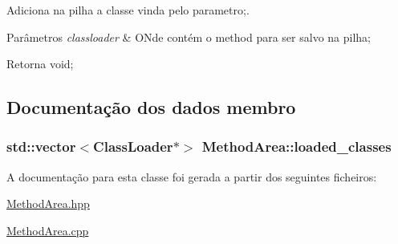 Adiciona na pilha a classe vinda pelo parametro;. 


\begin{DoxyParams}{Parâmetros}
{\em classloader} & O\+Nde contém o method para ser salvo na pilha; \\
\hline
\end{DoxyParams}
\begin{DoxyReturn}{Retorna}
void; 
\end{DoxyReturn}


\subsection{Documentação dos dados membro}
\subsubsection[{\texorpdfstring{loaded\+\_\+classes}{loaded_classes}}]{\setlength{\rightskip}{0pt plus 5cm}std\+::vector$<${\bf Class\+Loader}$\ast$$>$ Method\+Area\+::loaded\+\_\+classes}\hypertarget{class_method_area_a933a5cc7cab12dd6e6f2e3146a648b53}{}\label{class_method_area_a933a5cc7cab12dd6e6f2e3146a648b53}


A documentação para esta classe foi gerada a partir dos seguintes ficheiros\+:\begin{DoxyCompactItemize}
\item 
\hyperlink{_method_area_8hpp}{Method\+Area.\+hpp}\item 
\hyperlink{_method_area_8cpp}{Method\+Area.\+cpp}\end{DoxyCompactItemize}
